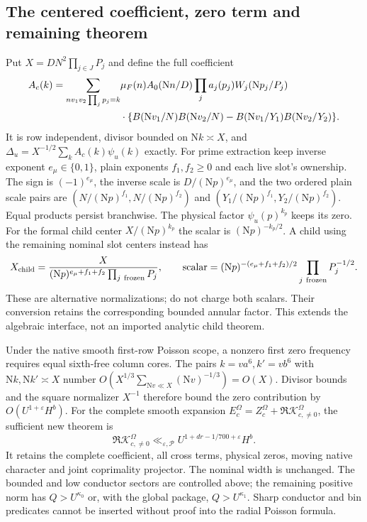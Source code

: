 \documentclass[11pt]{article}
\theoremstyle{definition}
\newcommand{\N}{\mathrm N}
\newcommand{\eps}{\varepsilon}
\newcommand{\lls}{\ll_{\eps,\mathcal P}}
\begin{document}
\subsection{The centered coefficient, zero term and remaining theorem}
Put $X=DN^2\prod_{j\in J}P_j$ and define the full coefficient
\begin{align}\label{ctr-coefficient}
 A_c(k)=\sum_{n v_1v_2\prod_jp_j=k}
 &\mu_F(n)A_0(\N n/D)\prod_j a_j(p_j)W_j(\N p_j/P_j)\notag\\
 &\cdot\{B(\N v_1/N)B(\N v_2/N)
             -B(\N v_1/Y_1)B(\N v_2/Y_2)\}.
\end{align}
It is row independent, divisor bounded on $\N k\asymp X$, and
$\Delta_u=X^{-1/2}\sum_kA_c(k)\psi_u(k)$ exactly.
For prime extraction keep inverse exponent $e_\mu\in\{0,1\}$,
plain exponents $f_1,f_2\ge0$ and each live slot's ownership.
The sign is $(-1)^{e_\mu}$, the inverse scale is
$D/(\N p)^{e_\mu}$, and the two ordered plain scale pairs are
$(N/(\N p)^{f_1},N/(\N p)^{f_2})$ and
$(Y_1/(\N p)^{f_1},Y_2/(\N p)^{f_2})$.
Equal products persist branchwise. The physical factor
$\psi_u(p)^{k_p}$ keeps its zero. For the formal child center
$X/(\N p)^{k_p}$ the scalar is $(\N p)^{-k_p/2}$.
A child using the remaining nominal slot centers instead has
\[
 X_{\rm child}=\frac{X}{(\N p)^{e_\mu+f_1+f_2}
                               \prod_{j\ {\rm frozen}}P_j},
 \qquad
 \text{scalar}=(\N p)^{-(e_\mu+f_1+f_2)/2}
                       \prod_{j\ {\rm frozen}}P_j^{-1/2}.
\]
These are alternative normalizations; do not charge both scalars.
Their conversion retains the corresponding bounded annular factor.
This extends the algebraic interface, not an imported analytic
child theorem.

Under the native smooth first-row Poisson scope, a nonzero first
zero frequency requires equal sixth-free column cores.
The pairs $k=va^6,k'=vb^6$ with $\N k,\N k'\asymp X$
number $O(X^{1/3}\sum_{\N v\ll X}(\N v)^{-1/3})=O(X)$.
Divisor bounds and the square normalizer $X^{-1}$ therefore bound
the zero contribution by $O(U^{1+\eps}H^b)$.
For the complete smooth expansion
$E_c^\Omega=Z_c^\Omega+\Re\mathcal K_{c,\ne0}^\Omega$,
the sufficient new theorem is
\begin{equation}\label{ctr-signed-target}
 \Re\mathcal K_{c,\ne0}^\Omega
      \lls U^{1+dr-1/700+\eps}H^b .
\end{equation}
It retains the complete coefficient, all cross terms, physical zeros,
moving native character and joint coprimality projector. The nominal
width is unchanged. The bounded and low conductor sectors are controlled
above; the remaining positive norm has $Q>U^{\kappa_0}$ or, with the
global package, $Q>U^{\kappa_1}$. Sharp conductor and bin predicates
cannot be inserted without proof into the radial Poisson formula.
\end{document}
